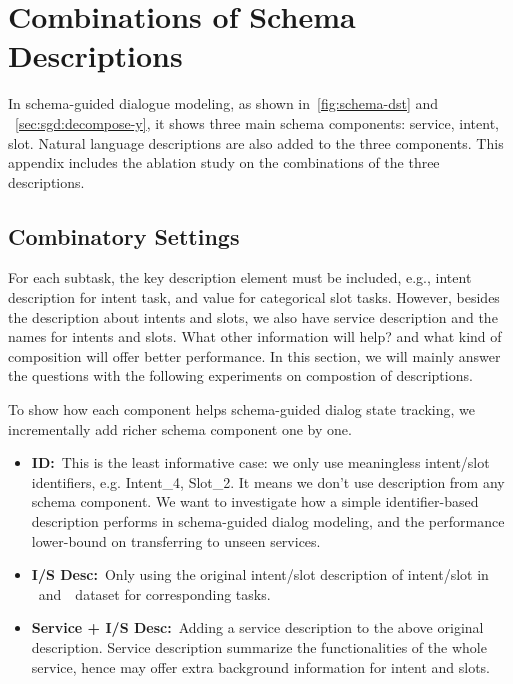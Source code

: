 \chapter[Combinations of Schema Descriptions]{Combinations of
  Schema Descriptions}
\label{chap:appendix:schema}
In schema-guided dialogue modeling, as shown
in~\autoref{fig:schema-dst} and ~\autoref{sec:sgd:decompose-y}, it
shows three main schema components: service, intent, slot. Natural
language descriptions are also added to the three components. This
appendix includes the ablation study on the combinations of the three
descriptions.

\section{Combinatory Settings}
\label{sec:sgd:com-desc}
For each subtask, the key description element must be included, e.g.,
intent description for intent task, and value for categorical slot
tasks. However, besides the description about intents and slots, we
also have service description and the names for intents and
slots. What other information will help? and what kind of composition
will offer better performance. In this section, we will mainly answer
the questions with the following experiments on compostion of
descriptions.

To show how each component helps schema-guided dialog state tracking,
we incrementally add richer schema component one by one.

\begin{itemize}
\item \textbf{ID:}~This is the least informative case: we only use
  meaningless intent/slot identifiers, e.g. Intent\_4, Slot\_2. It means we don't use
  description from any schema component. We want to investigate how a
  simple identifier-based description performs in schema-guided dialog
  modeling, and the performance lower-bound on transferring to unseen services.

\item \textbf{I/S Desc:}~Only using the original intent/slot description
  of intent/slot in \sgdst~and~\multiwoz~dataset for corresponding
  tasks.

\item \textbf{Service + I/S Desc:}~Adding a service description to the above
  original description. Service description summarize the
  functionalities of the whole service, hence may offer extra background
  information for intent and slots.
\end{itemize}

